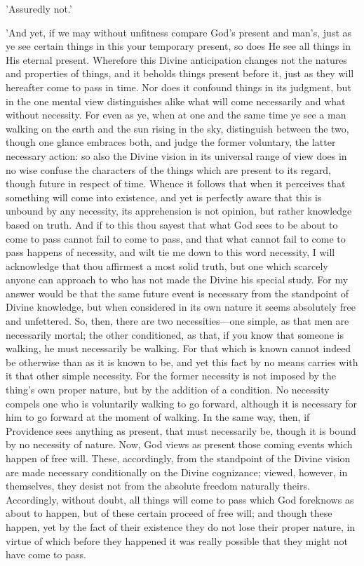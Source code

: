 'Assuredly not.'

'And yet, if we may without unfitness compare God's present and man's,
just as ye see certain things in this your temporary present, so does He
see all things in His eternal present. Wherefore this Divine
anticipation changes not the natures and properties of things, and it
beholds things present before it, just as they will hereafter come to
pass in time. Nor does it confound things in its judgment, but in the
one mental view distinguishes alike what will come necessarily and what
without necessity. For even as ye, when at one and the same time ye see
a man walking on the earth and the sun rising in the sky, distinguish
between the two, though one glance embraces both, and judge the former
voluntary, the latter necessary action: so also the Divine vision in its
universal range of view does in no wise confuse the characters of the
things which are present to its regard, though future in respect of
time. Whence it follows that when it perceives that something will come
into existence, and yet is perfectly aware that this is unbound by any
necessity, its apprehension is not opinion, but rather knowledge based
on truth. And if to this thou sayest that what God sees to be about to
come to pass cannot fail to come to pass, and that what cannot fail to
come to pass happens of necessity, and wilt tie me down to this word
necessity, I will acknowledge that thou affirmest a most solid truth,
but one which scarcely anyone can approach to who has not made the
Divine his special study. For my answer would be that the same future
event is necessary from the standpoint of Divine knowledge, but when
considered in its own nature it seems absolutely free and unfettered.
So, then, there are two necessities—one simple, as that men are
necessarily mortal; the other conditioned, as that, if you know that
someone is walking, he must necessarily be walking. For that which is
known cannot indeed be otherwise than as it is known to be, and yet this
fact by no means carries with it that other simple necessity. For the
former necessity is not imposed by the thing's own proper nature, but by
the addition of a condition. No necessity compels one who is voluntarily
walking to go forward, although it is necessary for him to go forward at
the moment of walking. In the same way, then, if Providence sees
anything as present, that must necessarily be, though it is bound by no
necessity of nature. Now, God views as present those coming events which
happen of free will. These, accordingly, from the standpoint of the
Divine vision are made necessary conditionally on the Divine
cognizance; viewed, however, in themselves, they desist not from the
absolute freedom naturally theirs. Accordingly, without doubt, all
things will come to pass which God foreknows as about to happen, but of
these certain proceed of free will; and though these happen, yet by the
fact of their existence they do not lose their proper nature, in virtue
of which before they happened it was really possible that they might not
have come to pass.

